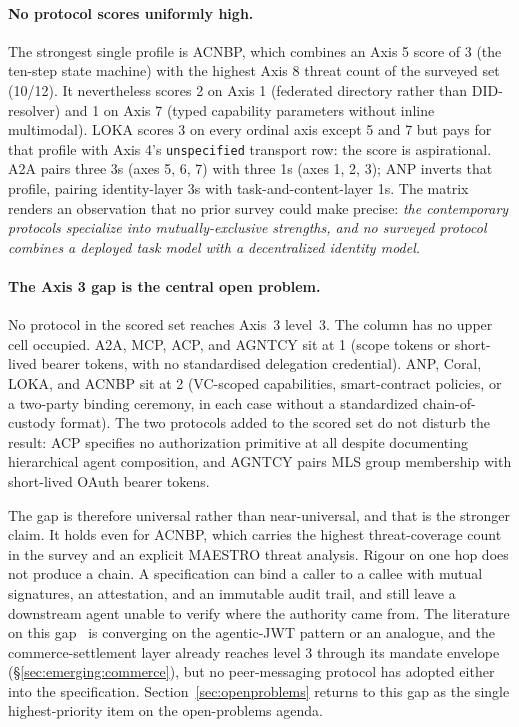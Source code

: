 \paragraph{No protocol scores uniformly high.}
The strongest single profile is ACNBP, which combines an
Axis 5 score of 3 (the ten-step state machine) with the
highest Axis 8 threat count of the surveyed set
(10/12). It nevertheless scores 2 on Axis 1 (federated
directory rather than DID-resolver) and 1 on Axis 7
(typed capability parameters without inline
multimodal). LOKA scores 3 on every ordinal axis except 5
and 7 but pays for that profile with Axis 4's
\texttt{unspecified} transport row: the score is
aspirational. A2A pairs three 3s (axes 5, 6, 7) with three
1s (axes 1, 2, 3); ANP inverts that profile, pairing
identity-layer 3s with task-and-content-layer 1s. The
matrix renders an observation that no prior survey could
make precise: \emph{the contemporary protocols specialize
into mutually-exclusive strengths, and no surveyed protocol
combines a deployed task model with a decentralized
identity model.}



\paragraph{The Axis 3 gap is the central open problem.}
No protocol in the scored set reaches Axis~3 level~3. The
column has no upper cell occupied. A2A, MCP, ACP, and
AGNTCY sit at 1 (scope tokens or short-lived bearer
tokens, with no standardised delegation credential). ANP,
Coral, LOKA, and ACNBP sit at 2 (VC-scoped capabilities,
smart-contract policies, or a two-party binding ceremony,
in each case without a standardized chain-of-custody
format). The two protocols added to the scored set do not
disturb the result: ACP specifies no authorization
primitive at all despite documenting hierarchical agent
composition, and AGNTCY pairs MLS group membership with
short-lived OAuth bearer tokens.

The gap is therefore universal rather than
near-universal, and that is the stronger claim. It holds
even for ACNBP, which carries the highest threat-coverage
count in the survey and an explicit MAESTRO threat
analysis. Rigour on one hop does not produce a chain. A
specification can bind a caller to a callee with mutual
signatures, an attestation, and an immutable audit trail,
and still leave a downstream agent unable to verify where
the authority came from. The literature on this
gap~\cite{authz_propagation, agentic_jwt, did_vc_agents}
is converging on the agentic-JWT pattern or an analogue,
and the commerce-settlement layer already reaches level 3
through its mandate envelope
(\S\ref{sec:emerging:commerce}), but no peer-messaging
protocol has adopted either into the specification.
Section~\ref{sec:openproblems} returns to
this gap as the single highest-priority item on the
open-problems agenda.

